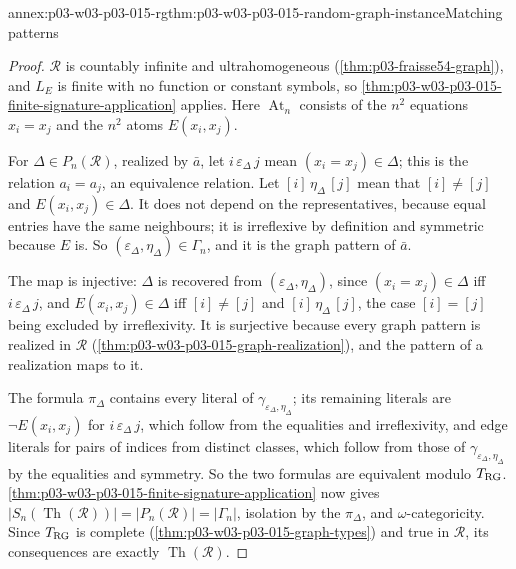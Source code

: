 \begin{annexitem}{annex:p03-w03-p03-015-rg}{thm:p03-w03-p03-015-random-graph-instance}{Matching patterns}
\begin{proof}
\(\mathcal R\) is countably infinite and ultrahomogeneous
(\cref{thm:p03-fraisse54-graph}), and \(L_E\) is finite with no function
or constant symbols, so \cref{thm:p03-w03-p03-015-finite-signature-application}
applies. Here \(\operatorname{At}_n\) consists of the \(n^2\) equations
\(x_i=x_j\) and the \(n^2\) atoms \(E(x_i,x_j)\).

For \(\Delta\in P_n(\mathcal R)\), realized by \(\bar a\), let
\(i\,\varepsilon_\Delta\,j\) mean \((x_i=x_j)\in\Delta\); this is the
relation \(a_i=a_j\), an equivalence relation. Let
\([i]\,\eta_\Delta\,[j]\) mean that \([i]\neq[j]\) and
\(E(x_i,x_j)\in\Delta\). It does not depend on the representatives,
because equal entries have the same neighbours; it is irreflexive by
definition and symmetric because \(E\) is. So
\((\varepsilon_\Delta,\eta_\Delta)\in\Gamma_n\), and it is the graph
pattern of \(\bar a\).

The map is injective: \(\Delta\) is recovered from
\((\varepsilon_\Delta,\eta_\Delta)\), since \((x_i=x_j)\in\Delta\) iff
\(i\,\varepsilon_\Delta\,j\), and \(E(x_i,x_j)\in\Delta\) iff
\([i]\neq[j]\) and \([i]\,\eta_\Delta\,[j]\), the case \([i]=[j]\) being
excluded by irreflexivity. It is surjective because every graph pattern
is realized in \(\mathcal R\) (\cref{thm:p03-w03-p03-015-graph-realization}),
and the pattern of a realization maps to it.

The formula \(\pi_\Delta\) contains every literal of
\(\gamma_{\varepsilon_\Delta,\eta_\Delta}\); its remaining literals are
\(\neg E(x_i,x_j)\) for \(i\,\varepsilon_\Delta\,j\), which follow from
the equalities and irreflexivity, and edge literals for pairs of indices
from distinct classes, which follow from those of
\(\gamma_{\varepsilon_\Delta,\eta_\Delta}\) by the equalities and
symmetry. So the two formulas are equivalent modulo \(T_{\rm RG}\).
\cref{thm:p03-w03-p03-015-finite-signature-application} now gives
\(|S_n(\operatorname{Th}(\mathcal R))|=|P_n(\mathcal R)|=|\Gamma_n|\),
isolation by the \(\pi_\Delta\), and \(\omega\)-categoricity.
Since \(T_{\rm RG}\) is complete (\cref{thm:p03-w03-p03-015-graph-types})
and true in \(\mathcal R\), its consequences are exactly
\(\operatorname{Th}(\mathcal R)\).
\end{proof}
\end{annexitem}

